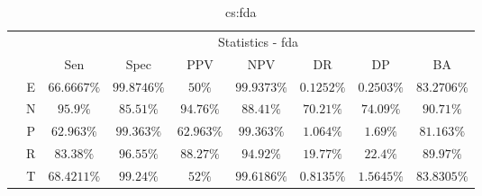 \begin{table}[!ht]
	\centering
	\begin{tabular}{|c|c|c|c|c|c|c|c|c|}
		\cline{3-9}
		\multicolumn{2}{c|}{} & \multicolumn{7}{c|}{Statistics - fda} \\ \cline{3-9}
		\multicolumn{2}{c|}{} & Sen & Spec & PPV & NPV & DR & DP & BA \\ \hline
		\multirow{5}{*}{\rotatebox{90}{Class}} & E & $66.6667\%$ & $99.8746\%$ & $50\%$ & $99.9373\%$ & $0.1252\%$ & $0.2503\%$ & $83.2706\%$ \\ \cline{2-9}
		 & N & $95.9\%$ & $85.51\%$ & $94.76\%$ & $88.41\%$ & $70.21\%$ & $74.09\%$ & $90.71\%$ \\ \cline{2-9}
		 & P & $62.963\%$ & $99.363\%$ & $62.963\%$ & $99.363\%$ & $1.064\%$ & $1.69\%$ & $81.163\%$ \\ \cline{2-9}
		 & R & $83.38\%$ & $96.55\%$ & $88.27\%$ & $94.92\%$ & $19.77\%$ & $22.4\%$ & $89.97\%$ \\ \cline{2-9}
		 & T & $68.4211\%$ & $99.24\%$ & $52\%$ & $99.6186\%$ & $0.8135\%$ & $1.5645\%$ & $83.8305\%$ \\ \hline
	\end{tabular}
	\caption{cs:fda}
	\label{tab:cs:fda}
\end{table}
